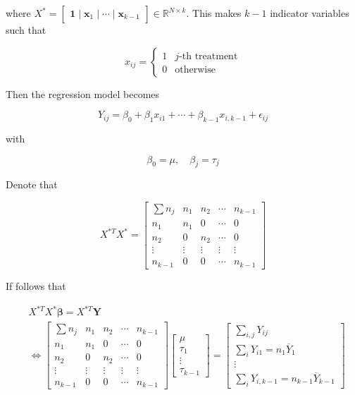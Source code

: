 \documentclass[]{book}
\theoremstyle{definition}
\theoremstyle{definition}
\theoremstyle{definition}
\theoremstyle{remark}
\begin{document}
where \(X^{\ast} = \begin{bmatrix} \mathbf{1} \mid \mathbf{x}_1 \mid \cdots \mid \mathbf{x}_{k - 1} \end{bmatrix} \in \mathbb{R}^{N \times k}\). This makes \(k - 1\) indicator variables such that

\[
x_{ij} = \begin{cases}
  1 & j\text{-th treatment} \\
  0 & \text{otherwise}
\end{cases}
\]

Then the regression model becomes

\[Y_{ij} = \beta_0 + \beta_1 x_{i1} + \cdots + \beta_{k - 1} x_{i, k - 1} + \epsilon_{ij}\]

with

\[\beta_0 = \mu, \quad \beta_j = \tau_j\]

Denote that

\[
X^{\ast T} X^{\ast} = \begin{bmatrix}
  \sum n_j & n_1 & n_2 & \cdots & n_{k - 1} \\
  n_1 & n_1 & 0 & \cdots & 0 \\
  n_2 & 0 & n_2 & \cdots & 0 \\
  \vdots & \vdots & \vdots & \vdots & \vdots \\
  n_{k - 1} & 0 & 0 & \cdots & n_{k - 1}
\end{bmatrix}
\]

If follows that

\begin{equation*}
  \begin{split}
   & X^{\ast T} X^{\ast} \boldsymbol\beta= X^{\ast T} \mathbf{Y} \\
   & \Leftrightarrow \begin{bmatrix}
    \sum n_j & n_1 & n_2 & \cdots & n_{k - 1} \\
    n_1 & n_1 & 0 & \cdots & 0 \\
    n_2 & 0 & n_2 & \cdots & 0 \\
    \vdots & \vdots & \vdots & \vdots & \vdots \\
    n_{k - 1} & 0 & 0 & \cdots & n_{k - 1}
  \end{bmatrix} \begin{bmatrix}
    \mu \\
    \tau_1 \\
    \vdots \\
    \tau_{k - 1}
  \end{bmatrix} = \begin{bmatrix}
    \sum_{i, j} Y_{ij} \\
    \sum_i Y_{i1} = n_1 \overline{Y}_1 \\
    \vdots \\
    \sum_i Y_{i, k - 1} = n_{k - 1} \overline{Y}_{k - 1}
  \end{bmatrix}
  \end{split}
\end{equation*}
\end{document}
